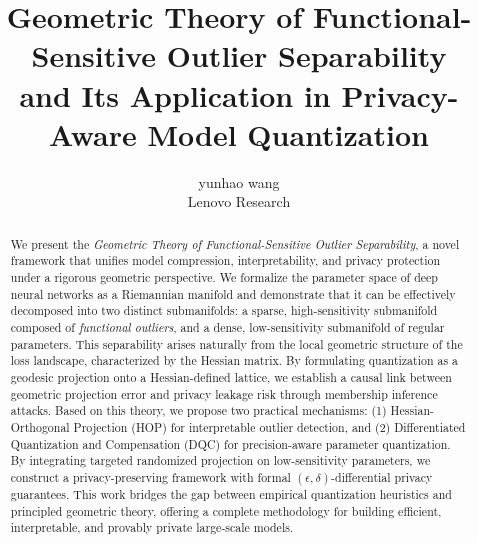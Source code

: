 \documentclass[letterpaper,twocolumn,10pt]{article}
\begin{document}

\date{}

\title{\Large \bf Geometric Theory of Functional-Sensitive Outlier Separability\\
and Its Application in Privacy-Aware Model Quantization}

\author{
{\rm yunhao wang} \\
Lenovo Research
} %

\maketitle

\begin{abstract}
We present the \emph{Geometric Theory of Functional-Sensitive Outlier Separability}, a novel framework that unifies model compression, interpretability, and privacy protection under a rigorous geometric perspective. We formalize the parameter space of deep neural networks as a Riemannian manifold and demonstrate that it can be effectively decomposed into two distinct submanifolds: a sparse, high-sensitivity submanifold composed of \emph{functional outliers}, and a dense, low-sensitivity submanifold of regular parameters. This separability arises naturally from the local geometric structure of the loss landscape, characterized by the Hessian matrix. By formulating quantization as a geodesic projection onto a Hessian-defined lattice, we establish a causal link between geometric projection error and privacy leakage risk through membership inference attacks. Based on this theory, we propose two practical mechanisms: (1) Hessian-Orthogonal Projection (HOP) for interpretable outlier detection, and (2) Differentiated Quantization and Compensation (DQC) for precision-aware parameter quantization. By integrating targeted randomized projection on low-sensitivity parameters, we construct a privacy-preserving framework with formal $(\epsilon, \delta)$-differential privacy guarantees. This work bridges the gap between empirical quantization heuristics and principled geometric theory, offering a complete methodology for building efficient, interpretable, and provably private large-scale models.
\end{abstract}
\end{document}
